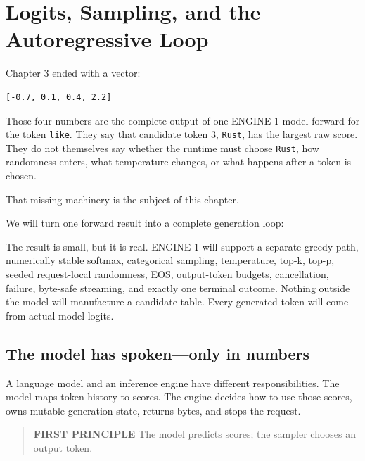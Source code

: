 \chapter{Logits, Sampling, and the Autoregressive Loop}\label{chapter-4-logits-sampling-and-the-autoregressive-loop}
Chapter 3 ended with a vector:

\begin{verbatim}
[-0.7, 0.1, 0.4, 2.2]
\end{verbatim}

Those four numbers are the complete output of one ENGINE-1 model forward
for the token \texttt{like}. They say that candidate token 3,
\texttt{Rust}, has the largest raw score. They do not themselves say
whether the runtime must choose \texttt{Rust}, how randomness enters,
what temperature changes, or what happens after a token is chosen.

That missing machinery is the subject of this chapter.

We will turn one forward result into a complete generation loop:


The result is small, but it is real. ENGINE-1 will support a separate
greedy path, numerically stable softmax, categorical sampling,
temperature, top-k, top-p, seeded request-local randomness, EOS,
output-token budgets, cancellation, failure, byte-safe streaming, and
exactly one terminal outcome. Nothing outside the model will manufacture
a candidate table. Every generated token will come from actual model
logits.

\section{The model has spoken---only in
numbers}\label{the-model-has-spokenonly-in-numbers}

A language model and an inference engine have different
responsibilities. The model maps token history to scores. The engine
decides how to use those scores, owns mutable generation state, returns
bytes, and stops the request.

\begin{quote}
\textbf{FIRST PRINCIPLE} The model predicts scores; the sampler chooses
an output token.
\end{quote}

